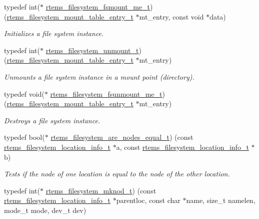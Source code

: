 \begin{DoxyCompactItemize}
typedef int($\ast$ \mbox{\hyperlink{group__LibIOFSOps_gab86f790d75005100fc4d847f7cdc8aef}{rtems\+\_\+filesystem\+\_\+fsmount\+\_\+me\+\_\+t}}) (\mbox{\hyperlink{structrtems__filesystem__mount__table__entry__tt}{rtems\+\_\+filesystem\+\_\+mount\+\_\+table\+\_\+entry\+\_\+t}} $\ast$mt\+\_\+entry, const void $\ast$data)
\begin{DoxyCompactList}\small\item\em Initializes a file system instance. \end{DoxyCompactList}\item 
typedef int($\ast$ \mbox{\hyperlink{group__LibIOFSOps_ga4eab60ad75d332e4ee4b1ee7ffb95690}{rtems\+\_\+filesystem\+\_\+unmount\+\_\+t}}) (\mbox{\hyperlink{structrtems__filesystem__mount__table__entry__tt}{rtems\+\_\+filesystem\+\_\+mount\+\_\+table\+\_\+entry\+\_\+t}} $\ast$mt\+\_\+entry)
\begin{DoxyCompactList}\small\item\em Unmounts a file system instance in a mount point (directory). \end{DoxyCompactList}\item 
typedef void($\ast$ \mbox{\hyperlink{group__LibIOFSOps_ga2f385e23e8448df4e51240f8377aac43}{rtems\+\_\+filesystem\+\_\+fsunmount\+\_\+me\+\_\+t}}) (\mbox{\hyperlink{structrtems__filesystem__mount__table__entry__tt}{rtems\+\_\+filesystem\+\_\+mount\+\_\+table\+\_\+entry\+\_\+t}} $\ast$mt\+\_\+entry)
\begin{DoxyCompactList}\small\item\em Destroys a file system instance. \end{DoxyCompactList}\item 
typedef bool($\ast$ \mbox{\hyperlink{group__LibIOFSOps_ga97ac953981e738d086a678a2cb66105d}{rtems\+\_\+filesystem\+\_\+are\+\_\+nodes\+\_\+equal\+\_\+t}}) (const \mbox{\hyperlink{group__LibIO_ga3252b3d31ee3c49ffff0b7604a676864}{rtems\+\_\+filesystem\+\_\+location\+\_\+info\+\_\+t}} $\ast$a, const \mbox{\hyperlink{group__LibIO_ga3252b3d31ee3c49ffff0b7604a676864}{rtems\+\_\+filesystem\+\_\+location\+\_\+info\+\_\+t}} $\ast$b)
\begin{DoxyCompactList}\small\item\em Tests if the node of one location is equal to the node of the other location. \end{DoxyCompactList}\item 
typedef int($\ast$ \mbox{\hyperlink{group__LibIOFSOps_ga9003ec0170a16478f8f47331b4fcad0a}{rtems\+\_\+filesystem\+\_\+mknod\+\_\+t}}) (const \mbox{\hyperlink{group__LibIO_ga3252b3d31ee3c49ffff0b7604a676864}{rtems\+\_\+filesystem\+\_\+location\+\_\+info\+\_\+t}} $\ast$parentloc, const char $\ast$name, size\+\_\+t namelen, mode\+\_\+t mode, dev\+\_\+t dev)

\end{DoxyCompactItemize}
